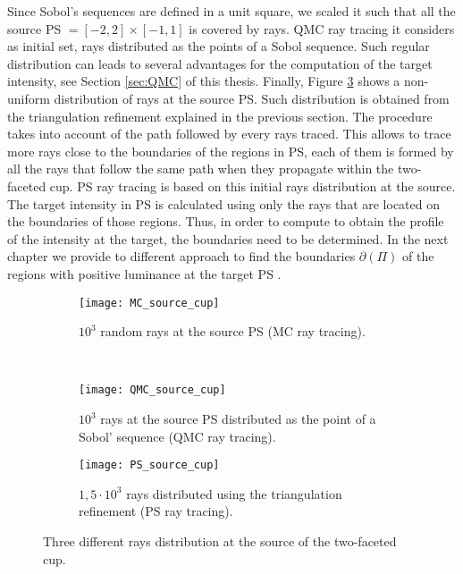 Since Sobol's sequences are defined in a unit square, we scaled it such that all the source PS $=[-2, 2]\times[-1, 1]$ is covered by rays. QMC ray tracing it considers as initial set, rays distributed as the points of a Sobol sequence. Such regular distribution can leads to several advantages for the computation of the target intensity, see Section \ref{sec:QMC} of this thesis. Finally, Figure \ref{fig:ps_sample} shows a non-uniform distribution of rays at the source PS. Such distribution is obtained from the triangulation refinement explained in the previous section. The procedure takes into account of the path followed by every rays traced. This allows to trace more rays close to the boundaries of the regions in PS, each of them is formed by all the rays that follow the same path when they propagate within the two-faceted cup. PS ray tracing is based on this initial rays distribution at the source. The target intensity in PS is calculated using only the rays that are located on the boundaries of those regions. Thus, in order to compute to obtain the profile of the intensity at the target, the boundaries need to be determined. In the next chapter we provide to different approach to find the boundaries $\partial$$(\Pi)$ of the regions with positive luminance at the target PS .
\begin{figure}[h]
 \begin{subfigure}[t]{\textwidth}
\centering
    \texttt{[image: MC\_source\_cup]}
    \caption{$10^3$ random rays at the source PS (MC ray tracing).}
    \label{fig:mc_sample}
\end{subfigure}
\hfill
\\
\begin{subfigure}[t]{\textwidth}
\centering
    \texttt{[image: QMC\_source\_cup]}
    \caption{$10^3$ rays at the source PS distributed as the point of a Sobol' sequence (QMC ray tracing).}
    \label{fig:qmc_sample}
\end{subfigure}
\hfill
\begin{subfigure}[t]{\textwidth}
\centering
\texttt{[image: PS\_source\_cup]}
\caption{$1,5\cdot10^3$ rays distributed using the triangulation refinement (PS ray tracing).}
\label{fig:ps_sample}
\end{subfigure}
\caption{Three different rays distribution at the source of the two-faceted cup.}
\label{fig:three_distributions}
\end{figure}

